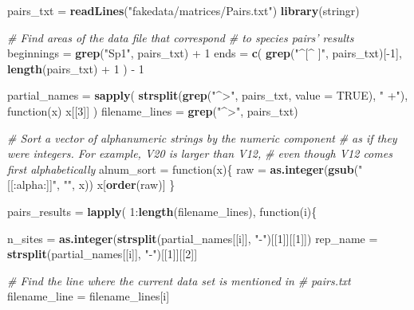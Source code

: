 \documentclass[11pt,]{article}
\newenvironment{Shaded}{\begin{snugshade}}{\end{snugshade}}
\newcommand{\KeywordTok}[1]{\textcolor[rgb]{0.13,0.29,0.53}{\textbf{{#1}}}}
\newcommand{\DataTypeTok}[1]{\textcolor[rgb]{0.13,0.29,0.53}{{#1}}}
\newcommand{\DecValTok}[1]{\textcolor[rgb]{0.00,0.00,0.81}{{#1}}}
\newcommand{\StringTok}[1]{\textcolor[rgb]{0.31,0.60,0.02}{{#1}}}
\newcommand{\CommentTok}[1]{\textcolor[rgb]{0.56,0.35,0.01}{\textit{{#1}}}}
\newcommand{\OtherTok}[1]{\textcolor[rgb]{0.56,0.35,0.01}{{#1}}}
\newcommand{\NormalTok}[1]{{#1}}
\begin{document}
\begin{Shaded}
\begin{Highlighting}[]
\NormalTok{pairs_txt =}\StringTok{ }\KeywordTok{readLines}\NormalTok{(}\StringTok{"fakedata/matrices/Pairs.txt"}\NormalTok{)}
\KeywordTok{library}\NormalTok{(stringr)}

\CommentTok{# Find areas of the data file that correspond}
\CommentTok{# to species pairs' results}
\NormalTok{beginnings =}\StringTok{ }\KeywordTok{grep}\NormalTok{(}\StringTok{"Sp1"}\NormalTok{, pairs_txt) +}\StringTok{ }\DecValTok{1}
\NormalTok{ends =}\StringTok{ }\KeywordTok{c}\NormalTok{(}
  \KeywordTok{grep}\NormalTok{(}\StringTok{"^[^ ]"}\NormalTok{, pairs_txt)[-}\DecValTok{1}\NormalTok{],}
  \KeywordTok{length}\NormalTok{(pairs_txt) +}\StringTok{ }\DecValTok{1}
\NormalTok{) -}\StringTok{ }\DecValTok{1}

\NormalTok{partial_names =}\StringTok{ }\KeywordTok{sapply}\NormalTok{(}
  \KeywordTok{strsplit}\NormalTok{(}\KeywordTok{grep}\NormalTok{(}\StringTok{"^>"}\NormalTok{, pairs_txt, }\DataTypeTok{value =} \OtherTok{TRUE}\NormalTok{), }\StringTok{" +"}\NormalTok{), }
  \NormalTok{function(x) x[[}\DecValTok{3}\NormalTok{]]}
\NormalTok{)}
\NormalTok{filename_lines =}\StringTok{ }\KeywordTok{grep}\NormalTok{(}\StringTok{"^>"}\NormalTok{, pairs_txt)}

\CommentTok{# Sort a vector of alphanumeric strings by the numeric component}
\CommentTok{# as if they were integers.  For example, V20 is larger than V12,}
\CommentTok{# even though V12 comes first alphabetically}
\NormalTok{alnum_sort =}\StringTok{ }\NormalTok{function(x)\{}
  \NormalTok{raw =}\StringTok{ }\KeywordTok{as.integer}\NormalTok{(}\KeywordTok{gsub}\NormalTok{(}\StringTok{"[[:alpha:]]"}\NormalTok{, }\StringTok{""}\NormalTok{, x))}
  \NormalTok{x[}\KeywordTok{order}\NormalTok{(raw)]}
\NormalTok{\}}

\NormalTok{pairs_results =}\StringTok{ }\KeywordTok{lapply}\NormalTok{(}
  \DecValTok{1}\NormalTok{:}\KeywordTok{length}\NormalTok{(filename_lines),}
  \NormalTok{function(i)\{}
    
    \NormalTok{n_sites =}\StringTok{ }\KeywordTok{as.integer}\NormalTok{(}\KeywordTok{strsplit}\NormalTok{(partial_names[[i]], }\StringTok{"-"}\NormalTok{)[[}\DecValTok{1}\NormalTok{]][[}\DecValTok{1}\NormalTok{]])}
    \NormalTok{rep_name =}\StringTok{ }\KeywordTok{strsplit}\NormalTok{(partial_names[[i]], }\StringTok{"-"}\NormalTok{)[[}\DecValTok{1}\NormalTok{]][[}\DecValTok{2}\NormalTok{]]}
    
    
    \CommentTok{# Find the line where the current data set is mentioned in}
    \CommentTok{# pairs.txt}
    \NormalTok{filename_line =}\StringTok{ }\NormalTok{filename_lines[i]}
    

\end{Highlighting}
\end{Shaded}
\end{document}
